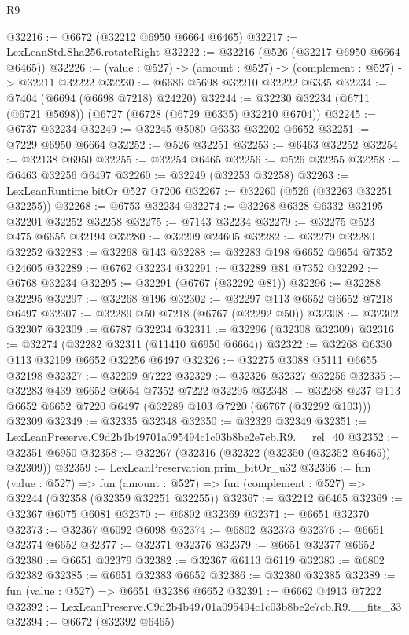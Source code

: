 \begin{lexlean}{R9}
\begin{coremodule}
@32216 := @6672 (@32212 @6950 @6664 @6465)
@32217 := LexLeanStd.Sha256.rotateRight
@32222 := @32216 (@526 (@32217 @6950 @6664 @6465))
@32226 := (value : @527) -> (amount : @527) -> (complement : @527) -> @32211 @32222
@32230 := @6686 @5698 @32210 @32222 @6335
@32234 := @7404 (@6694 (@6698 @7218) @24220)
@32244 := @32230 @32234 (@6711 (@6721 @5698)) (@6727 (@6728 (@6729 @6335) @32210 @6704))
@32245 := @6737 @32234
@32249 := @32245 @5080 @6333 @32202 @6652
@32251 := @7229 @6950 @6664
@32252 := @526 @32251
@32253 := @6463 @32252
@32254 := @32138 @6950
@32255 := @32254 @6465
@32256 := @526 @32255
@32258 := @6463 @32256 @6497
@32260 := @32249 (@32253 @32258)
@32263 := LexLeanRuntime.bitOr @527 @7206
@32267 := @32260 (@526 (@32263 @32251 @32255))
@32268 := @6753 @32234
@32274 := @32268 @6328 @6332 @32195 @32201 @32252 @32258
@32275 := @7143 @32234
@32279 := @32275 @523 @475 @6655 @32194
@32280 := @32209 @24605
@32282 := @32279 @32280 @32252
@32283 := @32268 @143
@32288 := @32283 @198 @6652 @6654 @7352 @24605
@32289 := @6762 @32234
@32291 := @32289 @81 @7352
@32292 := @6768 @32234
@32295 := @32291 (@6767 (@32292 @81))
@32296 := @32288 @32295
@32297 := @32268 @196
@32302 := @32297 @113 @6652 @6652 @7218 @6497
@32307 := @32289 @50 @7218 (@6767 (@32292 @50))
@32308 := @32302 @32307
@32309 := @6787 @32234
@32311 := @32296 (@32308 @32309)
@32316 := @32274 (@32282 @32311 (@11410 @6950 @6664))
@32322 := @32268 @6330 @113 @32199 @6652 @32256 @6497
@32326 := @32275 @3088 @5111 @6655 @32198
@32327 := @32209 @7222
@32329 := @32326 @32327 @32256
@32335 := @32283 @439 @6652 @6654 @7352 @7222 @32295
@32348 := @32268 @237 @113 @6652 @6652 @7220 @6497 (@32289 @103 @7220 (@6767 (@32292 @103))) @32309
@32349 := @32335 @32348
@32350 := @32329 @32349
@32351 := LexLeanPreserve.C9d2b4b49701a095494c1c03b8be2e7cb.R9.__rel_40
@32352 := @32351 @6950
@32358 := @32267 (@32316 (@32322 (@32350 (@32352 @6465)) @32309))
@32359 := LexLeanPreservation.prim_bitOr_u32
@32366 := fun (value : @527) =>
  fun (amount : @527) => fun (complement : @527) => @32244 (@32358 (@32359 @32251 @32255))
@32367 := @32212 @6465
@32369 := @32367 @6075 @6081
@32370 := @6802 @32369
@32371 := @6651 @32370
@32373 := @32367 @6092 @6098
@32374 := @6802 @32373
@32376 := @6651 @32374 @6652
@32377 := @32371 @32376
@32379 := @6651 @32377 @6652
@32380 := @6651 @32379
@32382 := @32367 @6113 @6119
@32383 := @6802 @32382
@32385 := @6651 @32383 @6652
@32386 := @32380 @32385
@32389 := fun (value : @527) => @6651 @32386 @6652
@32391 := @6662 @4913 @7222
@32392 := LexLeanPreserve.C9d2b4b49701a095494c1c03b8be2e7cb.R9.__fits_33
@32394 := @6672 (@32392 @6465)

\end{coremodule}
\end{lexlean}
